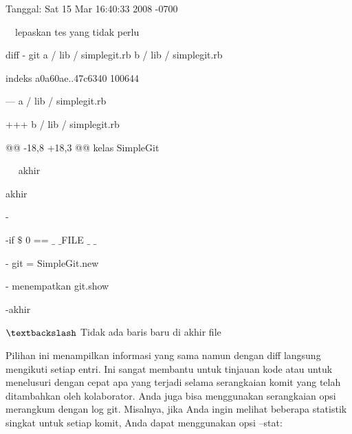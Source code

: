 \noindent 
 \hspace*{0.5in} Tanggal: Sat 15 Mar 16:40:33 2008 -0700 \par
\noindent 
 \hspace*{0.5in}  $  $ $  $ $  $ $  $lepaskan tes yang tidak perlu \par
\noindent 
 \hspace*{0.5in}  \hspace*{0.5in} diff - git a / lib / simplegit.rb b / lib / simplegit.rb \par
\noindent 
 \hspace*{0.5in}  \hspace*{0.5in} indeks a0a60ae..47c6340 100644 \par
\noindent 
 \hspace*{0.5in}  \hspace*{0.5in} --- a / lib / simplegit.rb \par
\noindent 
 \hspace*{0.5in}  \hspace*{0.5in} +++ b / lib / simplegit.rb \par
\noindent 
 \hspace*{0.5in}  \hspace*{0.5in} @@ -18,8 +18,3 @@ kelas SimpleGit \par
\noindent 
 \hspace*{0.5in}  \hspace*{0.5in}  $  $ $  $ $  $ $  $ $  $akhir \par
\noindent 
 \hspace*{0.5in}  $  $akhir \par
\noindent 
 \hspace*{0.5in} - \par
\noindent 
 \hspace*{0.5in} -if  $  \$  $ 0 ==  $  \_  $ $  \_  $FILE $  \_  $ $  \_  $ \par
\noindent 
 \hspace*{0.5in} - git = SimpleGit.new \par
\noindent 
 \hspace*{0.5in} - menempatkan git.show \par
\noindent 
 \hspace*{0.5in} -akhir \par
\noindent 
 \hspace*{0.5in}  $  \textbackslash  $ Tidak ada baris baru di akhir file \par
\noindent 
 \hspace*{0.5in} Pilihan ini menampilkan informasi yang sama namun dengan diff langsung mengikuti setiap entri. Ini sangat membantu untuk tinjauan kode atau untuk menelusuri dengan cepat apa yang terjadi selama serangkaian komit yang telah ditambahkan oleh kolaborator. Anda juga bisa menggunakan serangkaian opsi merangkum dengan log git. Misalnya, jika Anda ingin melihat beberapa statistik singkat untuk setiap komit, Anda dapat menggunakan opsi --stat: \par
